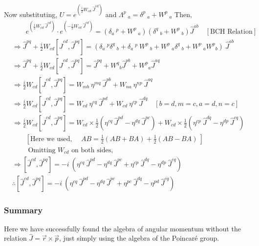 \documentclass[14pt]{article} %
\begin{document}
Now substituting, $ U=e^{ \left( \frac{i}{2}W_{cd}~\hat{J}^{cd} \right) }$ and $\Lambda^p~_a = \delta^p~_a + W^p~_a $
Then,
\begin{align*}
& \quad \quad e^{ \left( \frac{i}{2}W_{cd}~\hat{J}^{cd} \right) } \cdot e^{ \left( -\frac{i}{2}W_{cd}~\hat{J}^{cd} \right) } = (\delta_a~^p + W^p~_a)(\delta^q~_b + W^p~_b) \hat{J}^{ab} \quad [\text{BCH Relation}]\\
&\Rightarrow \hat{J}^{pq} + \frac{i}{2} W_{cd} [\hat{J}^{cd}, \hat{J}^{pq}] = \left( \delta_a~^p \delta^q~_b + \delta_a~^p~W^p~_b + W^p~_a \delta^q~_b + W^p~_a W^p{}_b \right)~ \hat{J}^{ab} \\
&\Rightarrow \hat{J}^{pq} + \frac{i}{2} W_{cd} [\hat{J}^{cd}, \hat{J}^{pq}] = \hat{J}^{pq} + W^q{}_b \hat{J}^{pb} + W^p{}_a \hat{J}^{a q} \\
&\Rightarrow \frac{i}{2} W_{cd} [\hat{J}^{cd}, \hat{J}^{pq}] = W_{mb}~ \eta^{mq}~\hat{J}^{pb} + W_{na}~ \eta^{np}~\hat{J}^{aq} \\
&\Rightarrow \frac{i}{2} W_{cd} [\hat{J}^{cd}, \hat{J}^{pq}] = W_{cd}~ \eta^{cq}~\hat{J}^{pd} + W_{cd}~ \eta^{cp}~\hat{J}^{dq} \quad [b=d, m=c, a=d, n=c] \\
&\Rightarrow \frac{i}{2} W_{cd} [\hat{J}^{cd}, \hat{J}^{pq}] = W_{cd}\times\frac{1}{2} \left( \eta^{cq}~\hat{J}^{pd} - \eta^{dq}~\hat{J}^{pc} \right) + W_{cd}\times\frac{1}{2} \left( \eta^{cp}~\hat{J}^{dq} - \eta^{dp}~\hat{J}^{cq} \right) \\
& \quad \quad \left[ \text{Here we used, }\quad AB = \frac{1}{2}(AB + BA) + \frac{1}{2}(AB - BA) ~\right] \\
& \quad \quad \text{ Omitting } W_{cd} \text{ on both sides,}\\
&\Rightarrow [\hat{J}^{cd}, \hat{J}^{pq}] = -i~\left( \eta^{cq}~\hat{J}^{pd} - \eta^{dq}~\hat{J}^{pc} + \eta^{cp}~\hat{J}^{dq} - \eta^{dp}~\hat{J}^{cq} \right) \\
& \therefore [\hat{J}^{cd}, \hat{J}^{pq}] = -i~\left( \eta^{cq}~\hat{J}^{pd} - \eta^{dq}~\hat{J}^{pc} + \eta^{pc}~\hat{J}^{dq} - \eta^{pd}~\hat{J}^{cq} \right)
\end{align*}
\subsubsection*{Summary}
Here we have successfully found the algebra of angular momentum without the relation $\hat{J} = \vec{r} \times \vec{p}$, just simply using the algebra of the Poincaré group.\\
\end{document}
